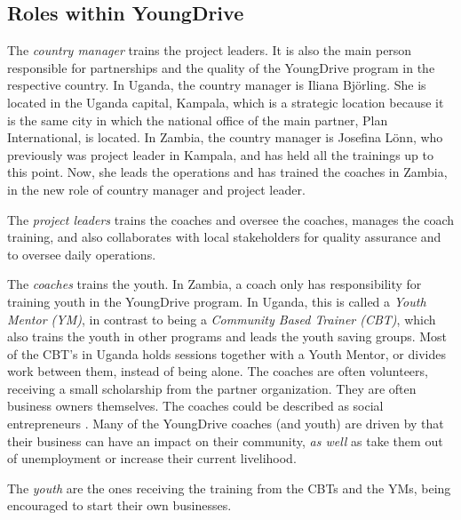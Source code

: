 \subsection{Roles within YoungDrive}

The \textit{country manager} trains the project leaders. It is also the main person responsible for partnerships and the quality of the YoungDrive program in the respective country. In Uganda, the country manager is Iliana Björling. She is located in the Uganda capital, Kampala, which is a strategic location because it is the same city in which the national office of the main partner, Plan International, is located. In Zambia, the country manager is Josefina Lönn, who previously was project leader in Kampala, and has held all the trainings up to this point. Now, she leads the operations and has trained the coaches in Zambia, in the new role of country manager and project leader.

The \textit{project leaders} trains the coaches and oversee the coaches, manages the coach training, and also collaborates with local stakeholders for quality assurance and to oversee daily operations.

The \textit{coaches} trains the youth. In Zambia, a coach only has responsibility for training youth in the YoungDrive program. In Uganda, this is called a \textit{Youth Mentor (YM)}, in contrast to being a \textit{Community Based Trainer (CBT)}, which also trains the youth in other programs and leads the youth saving groups. Most of the CBT's in Uganda holds sessions together with a Youth Mentor, or divides work between them, instead of being alone. The coaches are often volunteers, receiving a small scholarship from the partner organization. They are often business owners themselves. The coaches could be described as social entrepreneurs \citep{mitchel}. Many of the YoungDrive coaches (and youth) are driven by that their business can have an impact on their community, \textit{as well} as take them out of unemployment or increase their current livelihood.

The \textit{youth} are the ones receiving the training from the CBTs and the YMs, being encouraged to start their own businesses.
